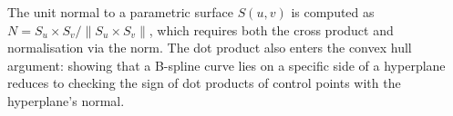 \begin{remark*}
The unit normal to a parametric surface $S(u,v)$ is computed as
$N = S_u \times S_v / \|S_u \times S_v\|$, which requires both the
cross product and normalisation via the norm.
The dot product also enters the convex hull argument: showing that a
B-spline curve lies on a specific side of a hyperplane reduces to
checking the sign of dot products of control points with the hyperplane's normal.
\end{remark*}
